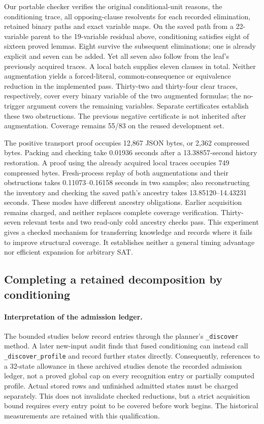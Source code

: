 \documentclass[11pt,a4paper]{article}
\numberwithin{equation}{section}
\theoremstyle{plain}
\theoremstyle{definition}
\theoremstyle{remark}
\begin{document}
Our portable checker verifies the original conditional-unit reasons, the conditioning trace, all opposing-clause resolvents for each recorded elimination, retained binary paths and exact variable maps. On the saved path from a 22-variable parent to the 19-variable residual above, conditioning satisfies eight of sixteen proved lemmas. Eight survive the subsequent eliminations; one is already explicit and seven can be added. Yet all seven also follow from the leaf's previously acquired traces. A local batch supplies eleven clauses in total. Neither augmentation yields a forced-literal, common-consequence or equivalence reduction in the implemented pass. Thirty-two and thirty-four clear traces, respectively, cover every binary variable of the two augmented formulas; the no-trigger argument covers the remaining variables. Separate certificates establish these two obstructions. The previous negative certificate is not inherited after augmentation. Coverage remains 55/83 on the reused development set.

The positive transport proof occupies 12,867 JSON bytes, or 2,362 compressed bytes. Packing and checking take 0.01936 seconds after a 13.38857-second history restoration. A proof using the already acquired local traces occupies 749 compressed bytes. Fresh-process replay of both augmentations and their obstructions takes 0.11073--0.16158 seconds in two samples; also reconstructing the inventory and checking the saved path's ancestry takes 13.85120--14.43231 seconds. These modes have different ancestry obligations. Earlier acquisition remains charged, and neither replaces complete coverage verification. Thirty-seven relevant tests and two read-only cold ancestry checks pass. This experiment gives a checked mechanism for transferring knowledge and records where it fails to improve structural coverage. It establishes neither a general timing advantage nor efficient expansion for arbitrary SAT.

\subsection{Completing a retained decomposition by conditioning}

\paragraph{Interpretation of the admission ledger.}
The bounded studies below record entries through the planner's
\texttt{\_discover} method. A later new-input audit finds that fused conditioning
can instead call \texttt{\_discover\_profile} and record further states directly.
Consequently, references to a 32-state allowance in these archived studies denote
the recorded admission ledger, not a proved global cap on every recognition entry
or partially computed profile. Actual stored rows and unfinished admitted states
must be charged separately. This does not invalidate checked reductions, but a
strict acquisition bound requires every entry point to be covered before work
begins. The historical measurements are retained with this qualification.
\end{document}
